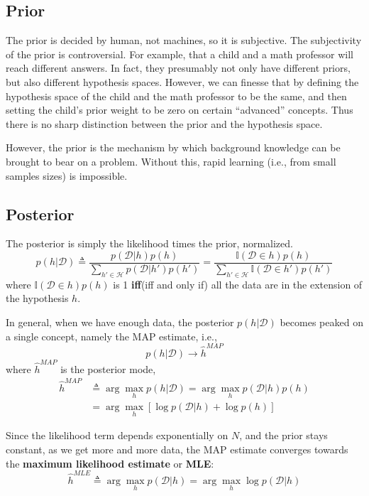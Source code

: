 \subsection{Prior}
The prior is decided by human, not machines, so it is subjective. The subjectivity of the prior is controversial. For example, that a child and a math professor will reach different answers. In fact, they presumably not only have different priors, but also different hypothesis spaces. However, we can finesse that by defining the hypothesis space of the child and the math professor to be the same, and then setting the child’s prior weight to be zero on certain “advanced” concepts. Thus there is no sharp distinction between the prior and the hypothesis space.

However, the prior is the mechanism by which background knowledge can be brought to bear on a problem. Without this, rapid learning (i.e., from small samples sizes) is impossible.


\subsection{Posterior}
The posterior is simply the likelihood times the prior, normalized.
\begin{equation}
p(h|\mathcal{D}) \triangleq \dfrac{p(\mathcal{D}|h)p(h)}{\sum_{h' \in \mathcal{H}}p(\mathcal{D}|h')p(h')}=\dfrac{\mathbb{I}(\mathcal{D} \in h)p(h)}{\sum_{h' \in \mathcal{H}}\mathbb{I}(\mathcal{D} \in h')p(h')}
\end{equation}
where $\mathbb{I}(\mathcal{D} \in h)p(h)$ is 1 \textbf{iff}(iff and only if) all the data are in the extension of the hypothesis $h$.

In general, when we have enough data, the posterior $p(h|\mathcal{D})$ becomes peaked on a single concept, namely the MAP estimate, i.e.,
\begin{equation}
p(h|\mathcal{D}) \rightarrow \hat{h}^{MAP}
\end{equation}
where $\hat{h}^{MAP}$ is the posterior mode,
\begin{equation}\begin{split}
\hat{h}^{MAP} & \triangleq \arg\max\limits_h p(h|\mathcal{D})=\arg\max\limits_h p(\mathcal{D}|h)p(h) \\
    & =\arg\max\limits_h [\log p(\mathcal{D}|h) + \log p(h)]
\end{split}\end{equation}

Since the likelihood term depends exponentially on $N$, and the prior stays constant, as we get more and more data, the MAP estimate converges towards the \textbf{maximum likelihood estimate} or \textbf{MLE}:
\begin{equation}
\hat{h}^{MLE} \triangleq \arg\max\limits_h p(\mathcal{D}|h)=\arg\max\limits_h \log p(\mathcal{D}|h)
\end{equation}

